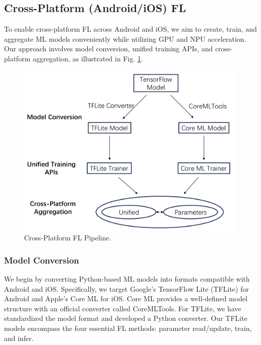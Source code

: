 \documentclass[letterpaper]{article} %
\begin{document}
\subsection{Cross-Platform (Android/iOS) FL}

To enable cross-platform FL across Android and iOS,
we aim to create, train, and aggregate ML models conveniently while
utilizing GPU and NPU acceleration.
Our approach involves model conversion, unified training APIs,
and cross-platform aggregation,
as illustrated in Fig. \ref{cross_fl}.

\begin{figure}
    \centering
    \includegraphics*[width=\linewidth]{cross_smart_fl_workflow.pdf}
    \caption{Cross-Platform FL Pipeline.}
    \label{cross_fl}
\end{figure}

\subsubsection{Model Conversion}
We begin by converting Python-based ML models into formats compatible with
Android and iOS.
Specifically, we target Google's TensorFlow Lite (TFLite) for Android and
Apple's Core ML for iOS.
Core ML provides a well-defined model structure with
an official converter called CoreMLTools.
For TFLite, we have standardized the model format and
developed a Python converter.
Our TFLite models encompass the four essential FL methods:
parameter read/update, train, and infer.
\end{document}
